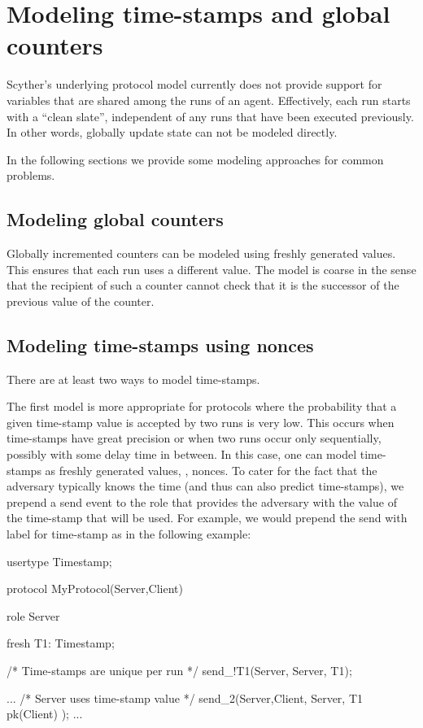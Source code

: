 \documentclass{book}
\begin{document}
\section{Modeling time-stamps and global counters}

Scyther's underlying protocol model currently does not provide support
for variables that are shared among the runs of an agent. Effectively, each run
starts with a ``clean slate'', independent of any runs that have been
executed previously. In other words, globally update state can not be
modeled directly.

In the following sections we provide some modeling approaches for
common problems. 

\subsection{Modeling global counters}

Globally incremented counters can be modeled using freshly generated
values. This ensures
that each run uses a different value. The model is coarse in the sense
that the recipient of such a
counter cannot check that it is the successor of the previous
value of the counter.


\subsection{Modeling time-stamps using nonces}

There are at least two ways to model time-stamps. 

The first model
is more appropriate for protocols where the probability that a given
time-stamp value is accepted by two runs is very low. This occurs when
time-stamps have great precision or when two runs occur only
sequentially, possibly with some delay time in between.
In this case, one can model time-stamps as freshly generated values,
\eg, nonces. To cater for the fact that the adversary typically knows
the time (and thus can also predict time-stamps), we prepend a
send event to the role that provides the adversary with the value of the
time-stamp that will be used. For example, we would
prepend the send with label  for time-stamp  as in the
following example:
\begin{spdl}
usertype Timestamp;

protocol MyProtocol(Server,Client) {
  role Server{
    fresh T1: Timestamp;

    /* Time-stamps are unique per run */
    send_!T1(Server, Server, T1);

    ...
    /* Server uses time-stamp value */
    send_2(Server,Client, { Server, T1 }pk(Client) );
    ...
  }
}
\end{spdl}
\end{document}
